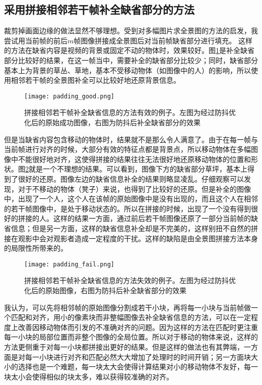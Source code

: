 \documentclass[journal, a4paper]{IEEEtran}
\begin{document}
\subsection{采用拼接相邻若干帧补全缺省部分的方法}
    裁剪掉画面边缘的做法显然不够理想。受到对多幅图片求全景图的方法的启发，我尝试用当前帧的前后$m$帧图像拼接成全景图后对当前帧缺省部分进行填充。
    这样的方法在缺省内容是视频的背景或固定不动的物体时，效果较好。图\ref{fig:padding_good}是补全缺省部分比较好的结果，在这一帧当中，需要补全的缺省部分比较少；同时，缺省部分基本上为背景的草丛、草地，基本不受移动物体（如图像中的人）的影响，所以使用相邻若干帧的全景图补全可以比较好地还原背景信息。\\
    \begin{figure}[!hbt]
        \begin{center}
        \texttt{[image: padding\_good.png]}
        \caption{拼接相邻若干帧补全缺省信息的方法有效的例子。左图为经过防抖优化后的原始成功图像，右图为防抖后补全缺省部分的效果}
        \label{fig:padding_good}
        \end{center}
    \end{figure}
    
    但是当缺省内容包含移动的物体时，结果就不是那么令人满意了。由于在每一帧与当前帧进行对齐的时候，大部分有效的特征点都是背景点，所以移动物体在多幅图像中不能很好地对齐，这使得拼接的结果往往无法很好地还原移动物体的位置和形状。图\ref{fig:padding_fail}就是一个不理想的结果。可以看到，图像下方的缺省部分草坪，基本上得到了很好的还原。图像左边的缺省信息补全的结果则略显凌乱。仔细观察可以发现，对于不移动的物体（凳子）来说，也得到了比较好的还原。但是补全的图像中，出现了一个人，这个人在该帧的原始图像中是没有出现的，而且这个人在相邻的若干帧图像中，是处于移动状态的。所以在拼接的时候，出现了一个没有得到很好的拼接的人。这样的结果一方面，通过前后若干帧图像还原了一部分当前帧的缺省信息；但是另一方面，这样的缺省信息补全却是不完美的，这样别扭不自然的拼接在观影中会对观影者造成一定程度的干扰。这样的缺陷是由全景图拼接方法本身的局限性所带来的。\\
    \begin{figure}[!hbt]
        \begin{center}
        \texttt{[image: padding\_fail.png]}
        \caption{拼接相邻若干帧补全缺省信息的方法失效的例子。左图为经过防抖优化后的原始图像，右图为防抖后补全缺省部分的效果}
        \label{fig:padding_fail}
        \end{center}
    \end{figure}
    
    我认为，可以先将相邻帧的原始图像分割成若干小块，再将每一小块与当前帧做一个匹配和对齐，用小的像素块而非整幅图像去补全缺省信息的方法，可以在一定程度上改善因移动物体而引发的不准确对齐的问题。因为这样的方法在匹配时更注重每一小块的局部位置而非整个图像的全局位置。所以对于移动的物体来说，这样的方法更侧重于对每一小块都拼接出更好的结果。但是这样的做法也有其弊端，一方面是对每一小块进行对齐和匹配必然大大增加了处理时的时间开销；另一方面块大小的选择也是一个难题，每一块太大会使得计算结果对小的移动物体不友好，每一块太小会使得相似的块太多，难以获得较准确的对齐。\\
    
\end{document}
